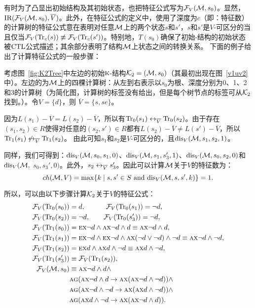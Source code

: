 有时为了凸显出初始结构及其初始状态，也把特征公式写为${\cal F}_V({\cal M}, s_0)$。显然，$\textrm{IR}({\cal F}_V({\cal M}, s_0), \overline V)$。此外，在特征公式的定义中，使用了深度为$c$（即：特征数）的计算树的特征公式意在表明对任意${\cal M}$上的两个状态$s$和$s'$，$s$和$s'$是$V$-可区分的当且仅当${\cal F}_V(\textrm{Tr}_c(s))\not \equiv {\cal F}_V(\textrm{Tr}_c(s'))$。特别地，$T(s_0)$确保了初始\MPK-结构的初始状态被$\textrm{CTL}$公式描述；其余部分表明了结构${\cal M}$上状态之间的转换关系。
下面的例子给出了计算特征公式的一般步骤：

\begin{example}\label{ex:4}
	考虑图~\ref{fig:K2Tree}中左边的初始$\textsc{k}$-结构${\cal K}_2= ({\cal M}, s_0)$（其最初出现在图~\ref{v1uv2}中）。左边的为${\cal M}$上的四棵计算树：从左到右表示以$s_0$为根、深度分别为0、1、2和3的计算树（为简化图，计算树的标签没有给出，但是每个树节点的标签可从${\cal K}_2$找到。）。令$V=\{d\}$，则 $\overline{V}=\{s, se\}$。
	
	因为$L(s_1) - \overline{V} = L(s_2) - \overline{V}$，所以有$\textrm{Tr}_0(s_1) \leftrightarrow_{\overline{V}} \textrm{Tr}_0(s_2)$。由于存在$(s_1, s_2)\in R$使得对任意的$(s_2, s') \in R$都有$L(s_2)- \overline V \neq L(s') - \overline V$，所以$\textrm{Tr}_1(s_1) \not \leftrightarrow_{\overline{V}} \textrm{Tr}_1(s_2)$。
	由此可知$s_1$和$s_2$是$V$-可区分的，且$\textrm{dis}_{V}({\cal M}, s_1, s_2, 1)$。
	
	 同样，我们可得到：$\textrm{dis}_{ V}({\cal M}, s_0, s_1, 0)$、$\textrm{dis}_{V}({\cal M}, s_1, s_3', 1)$、$\textrm{dis}_{V}({\cal M}, s_0, s_2, 0)$和$\textrm{dis}_{ V}({\cal M},$ $s_0, s_3', 0)$。此外，$s_2 \leftrightarrow_{\overline V} s_3'$。因此可以计算${\cal M}$关于$V$的特征数为：
	 $$ch({\cal M}, V)=\max\{k\mid s,s'\in S \text{ and } \textrm{dis}_{V}({\cal M},s,s',k)\} = 1.$$
	 
	  
	所以，可以由以下步骤计算${\cal K}_2$关于$V$的特征公式：
	\begin{align*}
		{\cal F}_V(\textrm{Tr}_0(s_0)) &= d, \qquad \quad {\cal F}_V(\textrm{Tr}_0(s_1)) = \neg d, \\
		{\cal F}_V(\textrm{Tr}_0(s_2)) &= \neg d,  \qquad  {\cal F}_V(\textrm{Tr}_0(s_3')) = \neg d,\\
		{\cal F}_V(\textrm{Tr}_1(s_0)) &= \textsc{e}\textsc{x} \neg d \wedge \textsc{a}\textsc{x} \neg d \wedge d \equiv \textsc{a}\textsc{x} \neg d \wedge d, \\
		{\cal F}_V(\textrm{Tr}_1(s_1)) &= \textsc{e}\textsc{x} \neg d \wedge \textsc{e}\textsc{x} \neg d  \wedge \textsc{a}\textsc{x} (\neg d \vee \neg d) \wedge \neg d 
		\equiv \textsc{a}\textsc{x} \neg d \wedge \neg d, \\
		{\cal F}_V(\textrm{Tr}_1(s_2)) &= \textsc{e}\textsc{x} d  \wedge \textsc{a}\textsc{x} d \wedge \neg d \equiv \textsc{a}\textsc{x} d \wedge \neg d,\\
		{\cal F}_V(\textrm{Tr}_1(s_3')) &\equiv {\cal F}_V(\textrm{Tr}_1(s_2)),\\
		{\cal F}_V({\cal M}, s_0)&\equiv \textsc{a}\textsc{x} \neg d \wedge d \wedge \\
		& \textsc{a} \textsc{g}(\textsc{a}\textsc{x} \neg d \wedge d \rightarrow \textsc{a}\textsc{x}(\textsc{a}\textsc{x} \neg d \wedge \neg d))\wedge \\
		& \textsc{a} \textsc{g}(\textsc{a}\textsc{x} \neg d \wedge \neg d \rightarrow \textsc{a}\textsc{x}(\textsc{a}\textsc{x} d \wedge \neg d)) \wedge\\
		& \textsc{a} \textsc{g}(\textsc{a}\textsc{x} d \wedge \neg d \rightarrow \textsc{a}\textsc{x}(\textsc{a}\textsc{x} \neg d \wedge d)).
	\end{align*}
	

\end{example}
